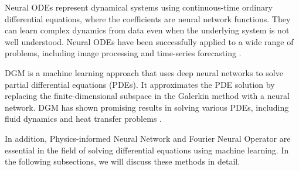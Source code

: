 Neural ODEs represent dynamical systems using continuous-time ordinary differential equations, where the coefficients are neural network functions. They can learn complex dynamics from data even when the underlying system is not well understood. Neural ODEs have been successfully applied to a wide range of problems, including image processing \cite{chen2020mri} and time-series forecasting \cite{chen2022forecasting,gao2022explainable}.

DGM is a machine learning approach that uses deep neural networks to solve partial differential equations (PDEs). It approximates the PDE solution by replacing the finite-dimensional subspace in the Galerkin method with a neural network. DGM has shown promising results in solving various PDEs, including fluid dynamics \cite{li2022deep} and heat transfer problems \cite{zhang2022deep}.

In addition, Physics-informed Neural Network and Fourier Neural Operator are essential in the field of solving differential equations using machine learning. In the following subsections, we will discuss these methods in detail.





